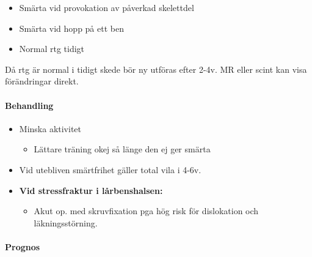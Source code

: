 \documentclass[
  letterpaper,
  DIV=11,
  numbers=noendperiod]{scrreport}
\let\oldparagraph\paragraph
\renewcommand{\paragraph}[1]{\oldparagraph{#1}\mbox{}}
\providecommand{\tightlist}{%
  \setlength{\itemsep}{0pt}\setlength{\parskip}{0pt}}\usepackage{longtable,booktabs,array}
\begin{document}
\begin{tcolorbox}[enhanced jigsaw, colback=white, colbacktitle=quarto-callout-note-color!10!white, toptitle=1mm, arc=.35mm, toprule=.15mm, rightrule=.15mm, titlerule=0mm, breakable, bottomrule=.15mm, colframe=quarto-callout-note-color-frame, left=2mm, opacityback=0, coltitle=black, title=\textcolor{quarto-callout-note-color}{\faInfo}\hspace{0.5em}{Fynd}, leftrule=.75mm, bottomtitle=1mm, opacitybacktitle=0.6]

\begin{itemize}
\tightlist
\item
  Smärta vid provokation av påverkad skelettdel
\item
  Smärta vid hopp på ett ben
\item
  Normal rtg tidigt
\end{itemize}

\end{tcolorbox}

Då rtg är normal i tidigt skede bör ny utföras efter 2-4v. MR eller
scint kan visa förändringar direkt.

\hypertarget{behandling-14}{%
\paragraph{Behandling}\label{behandling-14}}

\begin{itemize}
\tightlist
\item
  Minska aktivitet

  \begin{itemize}
  \tightlist
  \item
    Lättare träning okej så länge den ej ger smärta
  \end{itemize}
\item
  Vid utebliven smärtfrihet gäller total vila i 4-6v.
\item
  \textbf{Vid stressfraktur i lårbenshalsen:}

  \begin{itemize}
  \tightlist
  \item
    Akut op. med skruvfixation pga hög risk för dislokation och
    läkningsstörning.
  \end{itemize}
\end{itemize}

\hypertarget{prognos-12}{%
\paragraph{Prognos}\label{prognos-12}}
\end{document}
